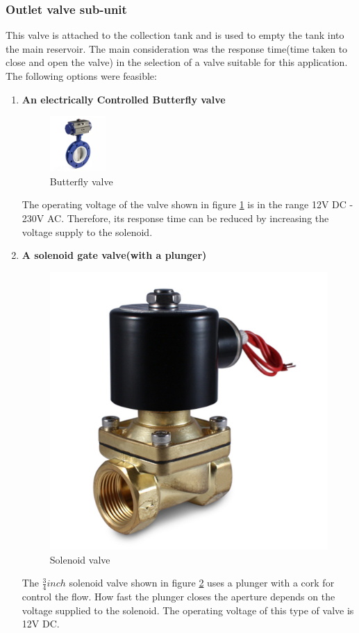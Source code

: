 \subsubsection{Outlet valve sub-unit}
This valve is attached to the collection tank and is used to empty the tank into the main reservoir. The main consideration was the response time(time taken to close and open the valve) in the selection of a valve suitable for this application. The following options were feasible:
\begin{enumerate}
    \item \textbf{An electrically Controlled Butterfly valve}
    \par
    \begin{figure}[H]
        \centering
        \includegraphics[width=0.2\textwidth, height=.2\textheight]{Figures/butterflyValve.png}
        \caption[Butterfly valve]{Butterfly valve \cite{butterfly}}
        \label{fig:butterfly_valve}
    \end{figure}
    The operating voltage of the valve shown in figure \ref{fig:butterfly_valve} is in the range 12V DC - 230V AC. Therefore, its response time can be reduced by increasing the voltage supply to the solenoid.
    \item \textbf{A solenoid gate valve(with a plunger)}
    \par
    \begin{figure}[H]
        \centering
        \includegraphics[width=.2\textwidth, height=.2\textheight]{Figures/solenoidValve.jpg}
        \caption[Solenoid valve]{Solenoid valve \cite{solenoid}}
        \label{fig:solenoid_valve}
    \end{figure}
    The $\frac{3}{4} inch$ solenoid valve shown in figure \ref{fig:solenoid_valve} uses a plunger with a cork for control the flow. How fast the plunger closes the aperture depends on the voltage supplied to the solenoid. The operating voltage of this type of valve is 12V DC.
\end{enumerate}

